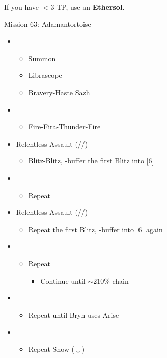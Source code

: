 \renewcommand{\third}{[3] Ruthless (\com/\rav/\sab)}
\renewcommand{\fifth}{[5] Relentless Assault (\com/\rav/\rav)}

If you have $<3$ TP, use an \textbf{Ethersol}.

\begin{battle}{Mission 63: Adamantortoise}
	\begin{itemize}
		\item \fourth
			\begin{itemize}
				\item Summon
				\item Librascope
				\item Bravery-Haste Sazh
			\end{itemize}
		\item \sixth
			\begin{itemize}
				\item Fire-Fira-Thunder-Fire
			\end{itemize}
		\item \fifth
			\begin{itemize}
				\item Blitz-Blitz, \rav-buffer the first Blitz into [6]
			\end{itemize}
		\item \sixth
			\begin{itemize}
				\item Repeat
			\end{itemize}
		\item \fifth
			\begin{itemize}
				\item Repeat the first Blitz, \rav-buffer into [6] again
			\end{itemize}
		\item \sixth
			\begin{itemize}
				\item Repeat
					\begin{itemize}
						\item Continue until $\sim$210\% chain
					\end{itemize}
			\end{itemize}
		\item \second
			\begin{itemize}
				\item Repeat until Bryn uses Arise
			\end{itemize}
		\item \fourth
			\begin{itemize}
				\item Repeat Snow ($\downarrow$)

\end{itemize}
\end{itemize}
\end{battle}
